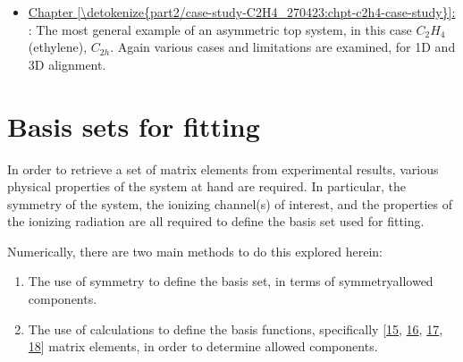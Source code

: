 \documentclass[letterpaper,table,10pt,english]{jupyterBook}
\begin{document}
\begin{itemize}
\begin{itemize}
\item {} 
\sphinxAtStartPar
\hyperref[\detokenize{part2/case-study-C2H4_270423:chpt-c2h4-case-study}]{Chapter \ref{\detokenize{part2/case-study-C2H4_270423:chpt-c2h4-case-study}}:} {\hyperref[\detokenize{part2/case-study-C2H4_270423:chpt-c2h4-case-study}]{}}: The most general example of an asymmetric top system, in this case \(C_2H_4\) (ethylene), \(C_{2h}\). Again various cases and limitations are examined, for 1D and 3D alignment.

\end{itemize}

\end{itemize}

\sphinxstepscope


\chapter{Basis sets for fitting}
\label{\detokenize{part2/sym-fitting-intro_220423:basis-sets-for-fitting}}\label{\detokenize{part2/sym-fitting-intro_220423:sect-basis-sets-fitting-intro}}\label{\detokenize{part2/sym-fitting-intro_220423::doc}}
\sphinxAtStartPar
In order to retrieve a set of matrix elements from experimental results, various physical properties of the system at hand are required. In particular, the symmetry of the system, the ionizing channel(s) of interest, and the properties of the ionizing radiation are all required to define the basis set used for fitting.

\sphinxAtStartPar
Numerically, there are two main methods to do this explored herein:
\begin{enumerate}
%
\item {} 
\sphinxAtStartPar
The use of symmetry to define the basis set, in terms of symmetry\sphinxhyphen{}allowed components.

\item {} 
\sphinxAtStartPar
The use of  calculations to define the basis functions, specifically  {[}\hyperlink{cite.backmatter/bibliography:id693}{15}, \hyperlink{cite.backmatter/bibliography:id567}{16}, \hyperlink{cite.backmatter/bibliography:id725}{17}, \hyperlink{cite.backmatter/bibliography:id696}{18}{]} matrix elements, in order to determine allowed components.

\end{enumerate}
\end{document}
